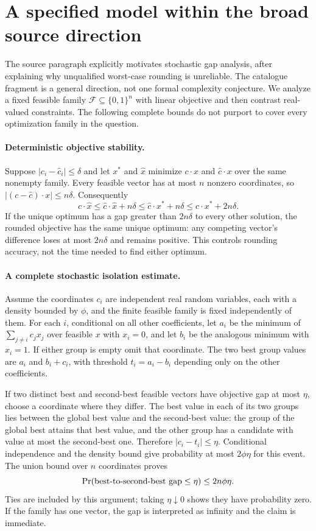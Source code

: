 \documentclass[11pt]{article}
\begin{document}
\section{A specified model within the broad source direction}
The source paragraph explicitly motivates stochastic gap analysis,
after explaining why unqualified worst-case rounding is unreliable.
The catalogue fragment is a general direction, not one formal
complexity conjecture. We analyze a fixed feasible family
$\mathcal F\subseteq\{0,1\}^n$ with linear objective and
then contrast real-valued constraints. The following complete bounds
do not purport to cover every optimization family in the question.

\paragraph{Deterministic objective stability.}
Suppose $|c_i-\widehat c_i|\le\delta$ and let $x^*$
and $\widehat x$ minimize $c\cdot x$ and
$\widehat c\cdot x$ over the same nonempty family. Every
feasible vector has at most $n$ nonzero coordinates, so
$|(c-\widehat c)\cdot x|\le n\delta$. Consequently
\[
c\cdot\widehat x
\le\widehat c\cdot\widehat x+n\delta
\le\widehat c\cdot x^*+n\delta
\le c\cdot x^*+2n\delta.
\]
If the unique optimum has a gap greater than $2n\delta$
to every other solution, the rounded objective has the same unique
optimum: any competing vector's difference loses at most $2n\delta$
and remains positive. This controls rounding accuracy, not the time
needed to find either optimum.

\paragraph{A complete stochastic isolation estimate.}
Assume the coordinates $c_i$ are independent real random variables,
each with a density bounded by $\phi$, and the finite feasible
family is fixed independently of them. For each $i$, conditional
on all other coefficients, let $a_i$ be the minimum of
$\sum_{j\ne i}c_jx_j$ over feasible $x$ with $x_i=0$,
and let $b_i$ be the analogous minimum with $x_i=1$.
If either group is empty omit that coordinate. The two best group
values are $a_i$ and $b_i+c_i$, with threshold
$t_i=a_i-b_i$ depending only on the other coefficients.

If two distinct best and second-best feasible vectors have objective
gap at most $\eta$, choose a coordinate where they differ.
The best value in each of its two groups lies between the global
best value and the second-best value: the group of the global
best attains that best value, and the other group has a candidate
with value at most the second-best one. Therefore
$|c_i-t_i|\le\eta$. Conditional independence and the density
bound give probability at most $2\phi\eta$ for this event.
The union bound over $n$ coordinates proves
\[
\Pr(\hbox{best-to-second-best gap}\le\eta)
\le2n\phi\eta.
\]
Ties are included by this argument; taking $\eta\downarrow0$
shows they have probability zero. If the family has one vector,
the gap is interpreted as infinity and the claim is immediate.
\end{document}
